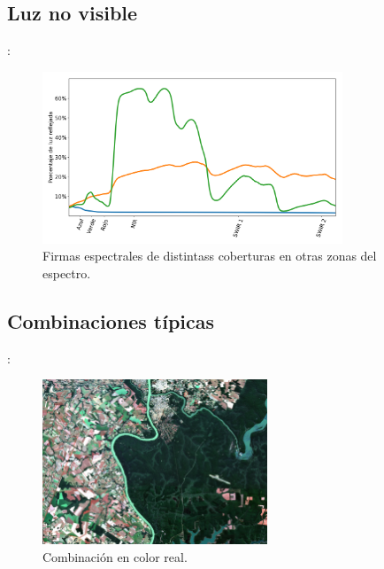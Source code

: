 \documentclass[aspectratio=169]{beamer}
\begin{document}
\subsection{Luz no visible}

\begin{frame}{\secname : \subsecname}
    \begin{figure}[h!]
        \centering
        \includegraphics[width=0.8\textwidth]{fig:spec.png}
        \caption{Firmas espectrales de distintass coberturas en otras zonas del espectro.}
        \label{fig:spec}
    \end{figure}
\end{frame}

\subsection{Combinaciones típicas}

\begin{frame}{\secname : \subsecname}
    \begin{figure}[h!]
        \centering
        \includegraphics[width=0.6\textwidth]{4-3-2.jpeg}
        \caption{Combinación en color real.}
        \label{4-3-2}
    \end{figure}
\end{frame}
\end{document}
